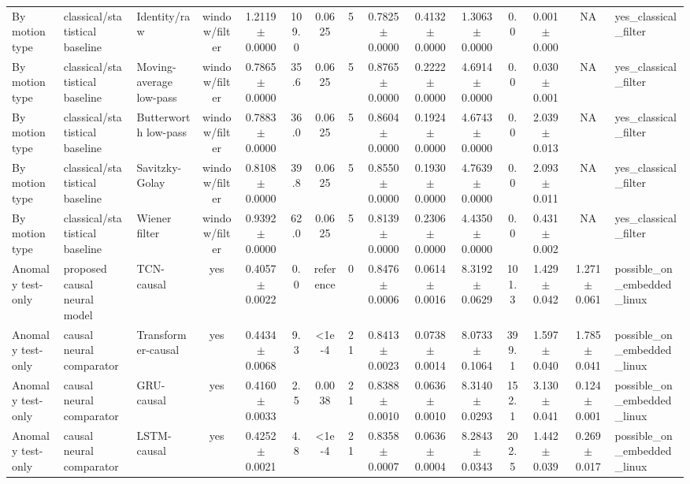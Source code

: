 \begin{table}[t]
{\begin{tabular}{lllcccccccccccl}
By motion type & classical/statistical baseline & Identity/raw & window/filter & 1.2119 $\pm$ 0.0000 & 109.0 & 0.0625 & 5 & 0.7825 $\pm$ 0.0000 & 0.4132 $\pm$ 0.0000 & 1.3063 $\pm$ 0.0000 & 0.0 & 0.001 $\pm$ 0.000 & NA & yes\_classical\_filter \\
By motion type & classical/statistical baseline & Moving-average low-pass & window/filter & 0.7865 $\pm$ 0.0000 & 35.6 & 0.0625 & 5 & 0.8765 $\pm$ 0.0000 & 0.2222 $\pm$ 0.0000 & 4.6914 $\pm$ 0.0000 & 0.0 & 0.030 $\pm$ 0.001 & NA & yes\_classical\_filter \\
By motion type & classical/statistical baseline & Butterworth low-pass & window/filter & 0.7883 $\pm$ 0.0000 & 36.0 & 0.0625 & 5 & 0.8604 $\pm$ 0.0000 & 0.1924 $\pm$ 0.0000 & 4.6743 $\pm$ 0.0000 & 0.0 & 2.039 $\pm$ 0.013 & NA & yes\_classical\_filter \\
By motion type & classical/statistical baseline & Savitzky-Golay & window/filter & 0.8108 $\pm$ 0.0000 & 39.8 & 0.0625 & 5 & 0.8550 $\pm$ 0.0000 & 0.1930 $\pm$ 0.0000 & 4.7639 $\pm$ 0.0000 & 0.0 & 2.093 $\pm$ 0.011 & NA & yes\_classical\_filter \\
By motion type & classical/statistical baseline & Wiener filter & window/filter & 0.9392 $\pm$ 0.0000 & 62.0 & 0.0625 & 5 & 0.8139 $\pm$ 0.0000 & 0.2306 $\pm$ 0.0000 & 4.4350 $\pm$ 0.0000 & 0.0 & 0.431 $\pm$ 0.002 & NA & yes\_classical\_filter \\
\midrule
Anomaly test-only & proposed causal neural model & TCN-causal & yes & 0.4057 $\pm$ 0.0022 & 0.0 & reference & 0 & 0.8476 $\pm$ 0.0006 & 0.0614 $\pm$ 0.0016 & 8.3192 $\pm$ 0.0629 & 101.3 & 1.429 $\pm$ 0.042 & 1.271 $\pm$ 0.061 & possible\_on\_embedded\_linux \\
Anomaly test-only & causal neural comparator & Transformer-causal & yes & 0.4434 $\pm$ 0.0068 & 9.3 & <1e-4 & 21 & 0.8413 $\pm$ 0.0023 & 0.0738 $\pm$ 0.0014 & 8.0733 $\pm$ 0.1064 & 399.1 & 1.597 $\pm$ 0.040 & 1.785 $\pm$ 0.041 & possible\_on\_embedded\_linux \\
Anomaly test-only & causal neural comparator & GRU-causal & yes & 0.4160 $\pm$ 0.0033 & 2.5 & 0.0038 & 21 & 0.8388 $\pm$ 0.0010 & 0.0636 $\pm$ 0.0010 & 8.3140 $\pm$ 0.0293 & 152.1 & 3.130 $\pm$ 0.041 & 0.124 $\pm$ 0.001 & possible\_on\_embedded\_linux \\
Anomaly test-only & causal neural comparator & LSTM-causal & yes & 0.4252 $\pm$ 0.0021 & 4.8 & <1e-4 & 21 & 0.8358 $\pm$ 0.0007 & 0.0636 $\pm$ 0.0004 & 8.2843 $\pm$ 0.0343 & 202.5 & 1.442 $\pm$ 0.039 & 0.269 $\pm$ 0.017 & possible\_on\_embedded\_linux \\

\end{tabular}}
\end{table}
